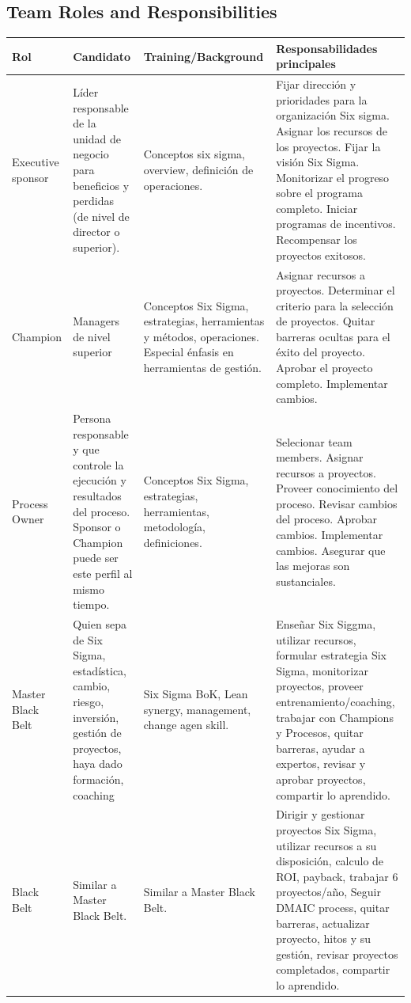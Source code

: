 \documentclass[]{article}
\begin{document}
\subsection{Team Roles and Responsibilities}

\begin{tabular}{p{1.5cm}|p{3cm}|p{4cm}|p{7cm}}
	\hline Rol & Candidato & Training/Background & Responsabilidades principales \\ 
	\hline Executive sponsor & Líder responsable de la unidad de negocio para beneficios y perdidas (de nivel de director o superior). & Conceptos six sigma, overview, definición de operaciones. & Fijar dirección y prioridades para la organización Six sigma. Asignar los recursos de los proyectos. Fijar la visión Six Sigma. Monitorizar el progreso sobre el programa completo. Iniciar programas de incentivos. Recompensar los proyectos exitosos.  \\ 
	\hline Champion & Managers de nivel superior & Conceptos Six Sigma, estrategias, herramientas y métodos, operaciones. Especial énfasis en herramientas de gestión. & Asignar recursos a proyectos. Determinar el criterio para la selección de proyectos. Quitar barreras ocultas para el éxito del proyecto. Aprobar el proyecto completo. Implementar cambios. \\ 
	\hline Process Owner & Persona responsable y que controle la ejecución y resultados del proceso. Sponsor o Champion puede ser este perfil al mismo tiempo. & Conceptos Six Sigma, estrategias, herramientas, metodología, definiciones. & Selecionar team members. Asignar recursos a proyectos. Proveer conocimiento del proceso. Revisar cambios del proceso. Aprobar cambios. Implementar cambios. Asegurar que las mejoras son sustanciales. \\ 
	\hline Master Black Belt & Quien sepa de Six Sigma, estadística, cambio, riesgo, inversión, gestión de proyectos, haya dado formación, coaching & Six Sigma BoK, Lean synergy, management, change agen skill. & Enseñar Six Siggma, utilizar recursos, formular estrategia Six Sigma, monitorizar proyectos, proveer entrenamiento/coaching, trabajar con Champions y Procesos, quitar barreras, ayudar a expertos, revisar y aprobar proyectos, compartir lo aprendido. \\
	\hline Black Belt & Similar a Master Black Belt. & Similar a Master Black Belt. & Dirigir y gestionar proyectos Six Sigma, utilizar recursos a su disposición, calculo de ROI, payback, trabajar 6 proyectos/año, Seguir DMAIC process, quitar barreras, actualizar proyecto, hitos y su gestión, revisar proyectos completados, compartir lo aprendido.\\

\end{tabular}
\end{document}
